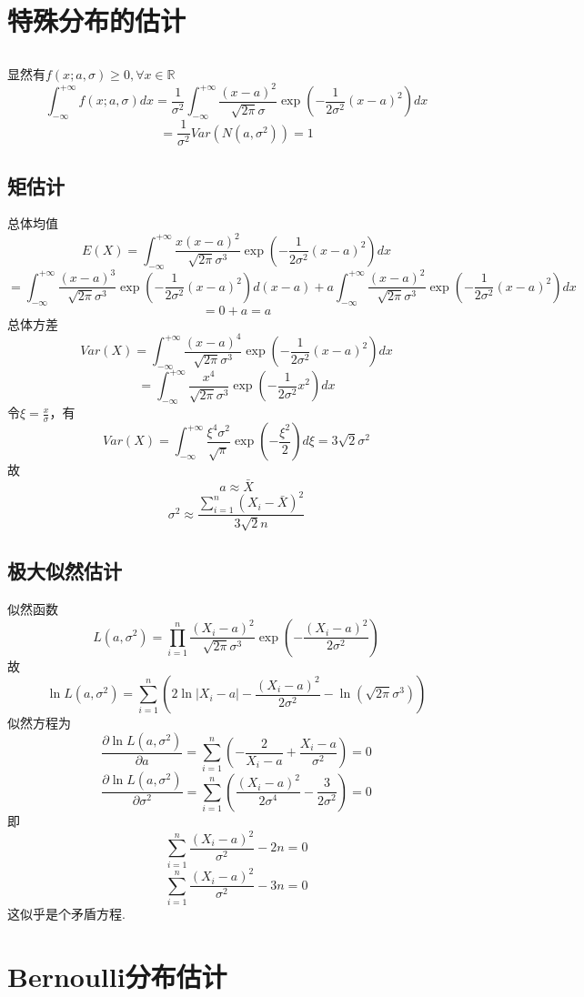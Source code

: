 \documentclass{article}
\begin{document}
\begin{CJK}{UTF8}{gbsn}
\section{特殊分布的估计}
\subsection{}
显然有$f(x;a,\sigma)\geq0,\forall x\in\mathbb{R}$
$$\int_{-\infty}^{+\infty}f(x;a,\sigma)dx=\frac{1}{\sigma^{2}}\int_{-\infty}^{+\infty}\frac{(x-a)^{2}}{\sqrt{2\pi}\sigma}\exp(-\frac{1}{2\sigma^{2}}(x-a)^{2})dx$$
$$ =\frac{1}{\sigma^{2}}Var(N(a,\sigma^{2}))=1$$
\subsection{矩估计}
总体均值
$$ E(X)=\int_{-\infty}^{+\infty}\frac{x(x-a)^{2}}{\sqrt{2\pi}\sigma^{3}}\exp(-\frac{1}{2\sigma^{2}}(x-a)^{2})dx$$
$$ =\int_{-\infty}^{+\infty}\frac{(x-a)^{3}}{\sqrt{2\pi}\sigma^{3}}\exp(-\frac{1}{2\sigma^{2}}(x-a)^{2})d(x-a)+a\int_{-\infty}^{+\infty}\frac{(x-a)^{2}}{\sqrt{2\pi}\sigma^{3}}\exp(-\frac{1}{2\sigma^{2}}(x-a)^{2})dx$$
$$ =0+a=a$$
总体方差
$$ Var(X)=\int_{-\infty}^{+\infty}\frac{(x-a)^{4}}{\sqrt{2\pi}\sigma^{3}}\exp(-\frac{1}{2\sigma^{2}}(x-a)^{2})dx$$
$$ =\int_{-\infty}^{+\infty}\frac{x^{4}}{\sqrt{2\pi}\sigma^{3}}\exp(-\frac{1}{2\sigma^{2}}x^{2})dx$$
令$\xi = \frac{x}{\sigma}$，有
$$ Var(X)=\int_{-\infty}^{+\infty}\frac{\xi^{4}\sigma^{2}}{\sqrt{\pi}}\exp(-\frac{\xi^{2}}{2})d\xi=3\sqrt{2}\sigma^{2}$$
故
$$ a\approx \bar{X}$$
$$ \sigma^{2} \approx \frac{\sum\limits_{i=1}^{n}(X_{i}-\bar{X})^{2}}{3\sqrt{2}n}$$
\subsection{极大似然估计}
似然函数
$$ L(a,\sigma^{2})=\prod\limits_{i=1}^{n}\frac{(X_{i}-a)^{2}}{\sqrt{2\pi}\sigma^{3}}\exp(-\frac{(X_{i}-a)^{2}}{2\sigma^{2}})$$
故
$$ \ln L(a,\sigma^{2})=\sum\limits_{i=1}^{n}(2\ln|X_{i}-a|-\frac{(X_{i}-a)^{2}}{2\sigma^{2}}-\ln(\sqrt{2\pi}\sigma^{3}))$$
似然方程为
$$ \frac{\partial\ln L(a,\sigma^{2})}{\partial a}=\sum\limits_{i=1}^{n}(-\frac{2}{X_{i}-a}+\frac{X_{i}-a}{\sigma^{2}})=0$$
$$ \frac{\partial\ln L(a,\sigma^{2})}{\partial \sigma^{2}}=\sum\limits_{i=1}^{n}(\frac{(X_{i}-a)^{2}}{2\sigma^{4}}-\frac{3}{2\sigma^{2}})=0$$
即
$$ \sum\limits_{i=1}^{n}\frac{(X_{i}-a)^{2}}{\sigma^{2}}-2n=0$$
$$ \sum\limits_{i=1}^{n}\frac{(X_{i}-a)^{2}}{\sigma^{2}}-3n=0$$
这似乎是个矛盾方程.
\section{Bernoulli分布估计}

\end{CJK}
\end{document}
